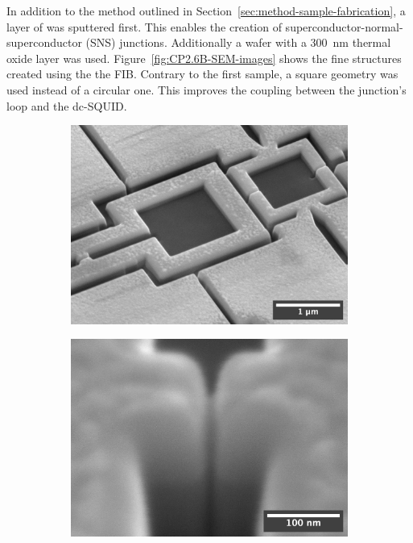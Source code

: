 In addition to the method outlined in Section~\ref{sec:method-sample-fabrication}, a layer of  was sputtered first. This enables the creation of superconductor-normal-superconductor (SNS) junctions. Additionally a  wafer with a \qty{300}{\nano\meter} thermal oxide layer was used. Figure~\ref{fig:CP2.6B-SEM-images} shows the fine structures created using the the FIB. Contrary to the first sample, a square geometry was used instead of a circular one. This improves the coupling between the junction's loop and the dc-SQUID.

\begin{figure}[ht!]
	\begin{subfigure}[t]{0.3\textwidth}
		\centering
		\subcaption{}
		\includegraphics[width=\textwidth]{figures/samples/CP2/CP2.6B_SEM_overview.jpg}
	\end{subfigure}
	\hfill
	\begin{subfigure}[t]{0.3\textwidth}
		\centering
		\subcaption{}
		\includegraphics[width=\textwidth]{figures/samples/CP2/CP2.6B_SEM_junction.jpg}

\end{subfigure}
\end{figure}
